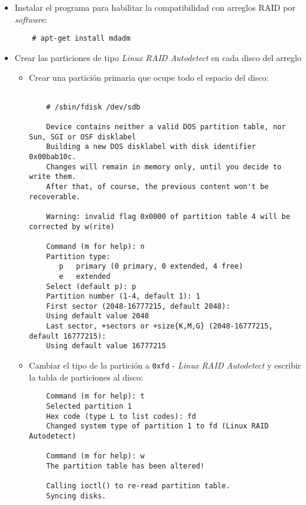 \begin{itemize}
  \item Instalar el programa para habilitar la compatibilidad con arreglos \textsc{\gls{RAID}} por \emph{\gls{software}}:

{
\scriptsize
\linespread{1}
\begin{verbatim}
    # apt-get install mdadm
\end{verbatim}
}

  \item Crear las particiones de tipo \textit{Linux RAID Autodetect} en cada disco del arreglo
    \begin{itemize}
      \item Crear una partici\'{o}n primaria que ocupe todo el espacio del disco:

{
\scriptsize
\linespread{1}
\begin{verbatim}

    # /sbin/fdisk /dev/sdb

    Device contains neither a valid DOS partition table, nor Sun, SGI or OSF disklabel
    Building a new DOS disklabel with disk identifier 0x00bab10c.
    Changes will remain in memory only, until you decide to write them.
    After that, of course, the previous content won't be recoverable.

    Warning: invalid flag 0x0000 of partition table 4 will be corrected by w(rite)

    Command (m for help): n
    Partition type:
       p   primary (0 primary, 0 extended, 4 free)
       e   extended
    Select (default p): p
    Partition number (1-4, default 1): 1
    First sector (2048-16777215, default 2048):
    Using default value 2048
    Last sector, +sectors or +size{K,M,G} (2048-16777215, default 16777215):
    Using default value 16777215
\end{verbatim}
}

      \item Cambiar el tipo de la partici\'{o}n a \texttt{0xfd} - \textit{Linux RAID Autodetect} y escribir la tabla de particiones al disco:

{
\scriptsize
\linespread{1}
\begin{verbatim}
    Command (m for help): t
    Selected partition 1
    Hex code (type L to list codes): fd
    Changed system type of partition 1 to fd (Linux RAID Autodetect)

    Command (m for help): w
    The partition table has been altered!

    Calling ioctl() to re-read partition table.
    Syncing disks.
\end{verbatim}
}


\end{itemize}
\end{itemize}
